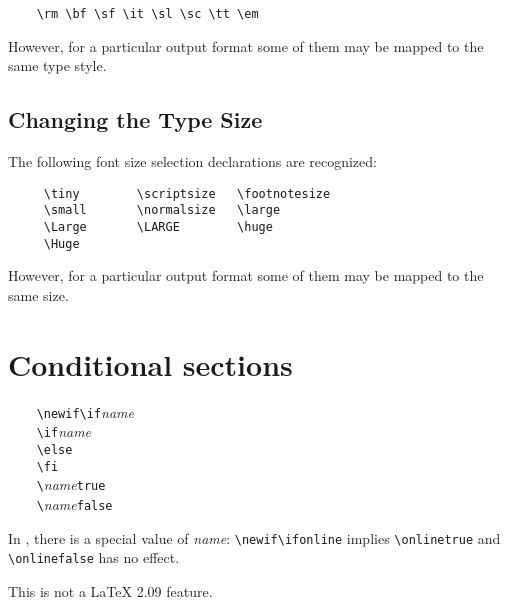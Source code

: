 \verb'    \rm \bf \sf \it \sl \sc \tt \em'

However, for a particular output format some of them may be mapped
to the same type style.

\subsection{Changing the Type Size}

The following font size selection declarations are recognized:

\begin{verbatim}
     \tiny        \scriptsize   \footnotesize
     \small       \normalsize   \large
     \Large       \LARGE        \huge
     \Huge
\end{verbatim}

However, for a particular output format some of them may be mapped
to the same size.

\section{Conditional sections}

\verb'    \newif\if'{\it name} \\
\verb'    \if'{\it name}    \\
\verb'    \else'  \\
\verb'    \fi'    \\
\verb'    \'{\it name}\verb'true'  \\
\verb'    \'{\it name}\verb'false'

In \LO, there is a special value of {\it name}:
\verb'\newif\ifonline' implies \verb'\onlinetrue'
and \verb'\onlinefalse' has no effect.

This is not a LaTeX 2.09 feature.





